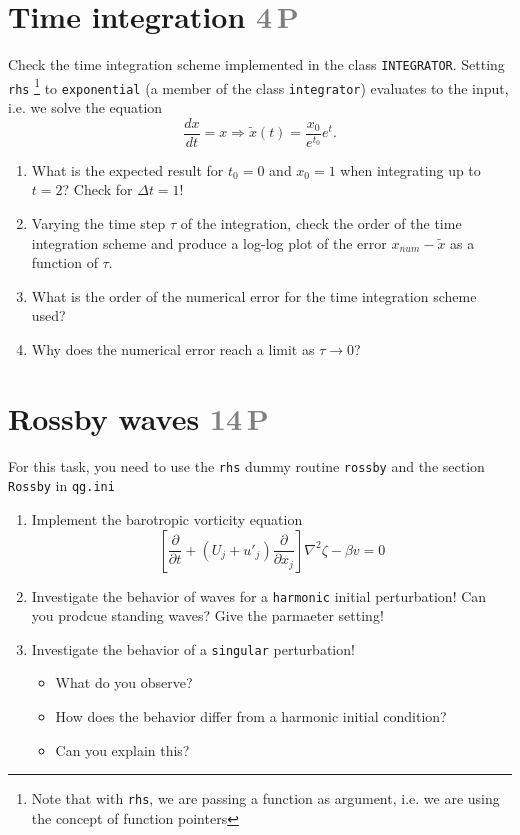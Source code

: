 \documentclass[jobname=project, 10pt]{article}
\newcommand{\p}{\partial}       %
\newcommand{\task}[2]{\section{#1 \hfill \normalsize\normalfont \textcolor{gray}{#2\,P}}\addtocounter{ptot}{#2}}
\newcounter{ptot}
\begin{document}
\task{Time integration}{4} 
Check the time integration scheme implemented in the class \texttt{INTEGRATOR}. Setting \texttt{rhs} \footnote{Note that with \texttt{rhs}, we are passing a function as argument, i.e. we are using the concept of function pointers} to \texttt{exponential} (a member of the class \texttt{integrator}) evaluates to the input, i.e. we solve the equation
\[\frac{d x}{d t} = x \Rightarrow \tilde{x}(t) = \frac{x_0}{e^{t_0}} e^t. \]

\begin{enumerate}[label=\alph*)]
\item What is the expected result  for $t_0=0$ and $x_0=1$ when integrating up to $t=2$? Check for $\Delta t=1$!
\item Varying the time step $\tau$ of the integration, check the order of the time integration scheme
  and produce a log-log plot of the error $x_{num} - \tilde{x}$ as a function of $\tau$.
\item What is the order of the numerical error for the time integration scheme used?
\item Why does the numerical error reach a limit as $\tau \rightarrow 0$? 
\end{enumerate}

\task{Rossby waves}{14}
For this task, you need to use the \texttt{rhs} dummy routine \texttt{rossby} and the section \texttt{Rossby} in \texttt{qg.ini}
\begin{enumerate}[label=\alph*)]
\item Implement the barotropic vorticity equation
  \[ \left[\frac{\p}{\p t} + \left(U_j + {u'}_j\right) \frac{\p}{\p x_j}\right] \nabla^2 \zeta - \beta v = 0 \]
\item Investigate the behavior of waves for a \texttt{harmonic} initial perturbation! Can you prodcue standing waves? Give the parmaeter setting!
\item Investigate the behavior of a \texttt{singular} perturbation!
  \begin{itemize}
  \item What do you observe?
  \item How does the behavior differ from a harmonic initial condition?
  \item Can you explain this?
  \end{itemize}
\end{enumerate}
\end{document}
